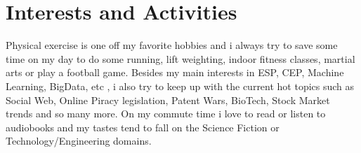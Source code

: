 \documentclass[a4paper,10pt]{article}
\begin{document}
\section{Interests and Activities}
Physical exercise is one off my favorite hobbies and i always try to save some time on my day to do some running, lift weighting, indoor fitness classes, martial arts or play a football game.
Besides my main interests in ESP, CEP, Machine Learning, BigData, etc , i also try to keep up with the current hot topics such as Social Web, Online Piracy legislation, Patent Wars, BioTech, Stock Market trends and so many more.
On my commute time i love to read or listen to audiobooks and my tastes tend to fall on the Science Fiction or Technology/Engineering domains.
\end{document}
